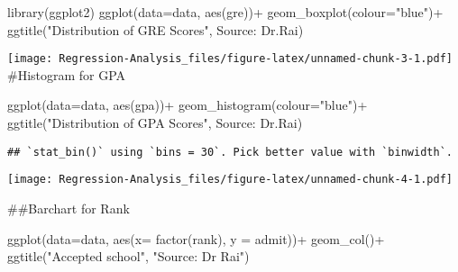 \documentclass[
]{article}
\newenvironment{Shaded}{\begin{snugshade}}{\end{snugshade}}
\newcommand{\AttributeTok}[1]{\textcolor[rgb]{0.77,0.63,0.00}{#1}}
\newcommand{\FunctionTok}[1]{\textcolor[rgb]{0.00,0.00,0.00}{#1}}
\newcommand{\NormalTok}[1]{#1}
\newcommand{\SpecialCharTok}[1]{\textcolor[rgb]{0.00,0.00,0.00}{#1}}
\newcommand{\StringTok}[1]{\textcolor[rgb]{0.31,0.60,0.02}{#1}}
\begin{document}
\begin{Shaded}
\begin{Highlighting}[]
\FunctionTok{library}\NormalTok{(ggplot2)}
\FunctionTok{ggplot}\NormalTok{(}\AttributeTok{data=}\NormalTok{data, }\FunctionTok{aes}\NormalTok{(gre))}\SpecialCharTok{+}
  \FunctionTok{geom\_boxplot}\NormalTok{(}\AttributeTok{colour=}\StringTok{"blue"}\NormalTok{)}\SpecialCharTok{+}
  \FunctionTok{ggtitle}\NormalTok{(}\StringTok{"Distribution of GRE Scores"}\NormalTok{, }\StringTok{\textquotesingle{}Source: Dr.Rai\textquotesingle{}}\NormalTok{)}
\end{Highlighting}
\end{Shaded}

\texttt{[image: Regression-Analysis\_files/figure-latex/unnamed-chunk-3-1.pdf]}
\#Histogram for GPA

\begin{Shaded}
\begin{Highlighting}[]
\FunctionTok{ggplot}\NormalTok{(}\AttributeTok{data=}\NormalTok{data, }\FunctionTok{aes}\NormalTok{(gpa))}\SpecialCharTok{+}
  \FunctionTok{geom\_histogram}\NormalTok{(}\AttributeTok{colour=}\StringTok{"blue"}\NormalTok{)}\SpecialCharTok{+}
  \FunctionTok{ggtitle}\NormalTok{(}\StringTok{"Distribution of GPA Scores"}\NormalTok{, }\StringTok{\textquotesingle{}Source: Dr.Rai\textquotesingle{}}\NormalTok{)}
\end{Highlighting}
\end{Shaded}

\begin{verbatim}
## `stat_bin()` using `bins = 30`. Pick better value with `binwidth`.
\end{verbatim}

\texttt{[image: Regression-Analysis\_files/figure-latex/unnamed-chunk-4-1.pdf]}

\#\#Barchart for Rank

\begin{Shaded}
\begin{Highlighting}[]
\FunctionTok{ggplot}\NormalTok{(}\AttributeTok{data=}\NormalTok{data, }\FunctionTok{aes}\NormalTok{(}\AttributeTok{x=} \FunctionTok{factor}\NormalTok{(rank), }\AttributeTok{y =}\NormalTok{ admit))}\SpecialCharTok{+}
  \FunctionTok{geom\_col}\NormalTok{()}\SpecialCharTok{+}
  \FunctionTok{ggtitle}\NormalTok{(}\StringTok{"Accepted school"}\NormalTok{, }\StringTok{"Source: Dr Rai"}\NormalTok{)}
\end{Highlighting}
\end{Shaded}
\end{document}
